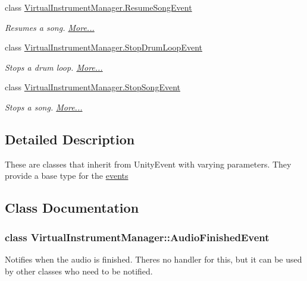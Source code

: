 \begin{DoxyCompactItemize}
class \hyperlink{group___v_i_m_event_types_class_virtual_instrument_manager_1_1_resume_song_event}{Virtual\+Instrument\+Manager.\+Resume\+Song\+Event}
\begin{DoxyCompactList}\small\item\em Resumes a song.  \hyperlink{group___v_i_m_event_types_class_virtual_instrument_manager_1_1_resume_song_event}{More...}\end{DoxyCompactList}\item 
class \hyperlink{group___v_i_m_event_types_class_virtual_instrument_manager_1_1_stop_drum_loop_event}{Virtual\+Instrument\+Manager.\+Stop\+Drum\+Loop\+Event}
\begin{DoxyCompactList}\small\item\em Stops a drum loop.  \hyperlink{group___v_i_m_event_types_class_virtual_instrument_manager_1_1_stop_drum_loop_event}{More...}\end{DoxyCompactList}\item 
class \hyperlink{group___v_i_m_event_types_class_virtual_instrument_manager_1_1_stop_song_event}{Virtual\+Instrument\+Manager.\+Stop\+Song\+Event}
\begin{DoxyCompactList}\small\item\em Stops a song.  \hyperlink{group___v_i_m_event_types_class_virtual_instrument_manager_1_1_stop_song_event}{More...}\end{DoxyCompactList}\end{DoxyCompactItemize}


\subsection{Detailed Description}
These are classes that inherit from Unity\+Event with varying parameters. They provide a base type for the \hyperlink{group___v_i_m_events}{events } 

\subsection{Class Documentation}
\label{class_virtual_instrument_manager_1_1_audio_finished_event}
\subsubsection{class Virtual\+Instrument\+Manager\+:\+:Audio\+Finished\+Event}
Notifies when the audio is finished. There\textquotesingle{}s no handler for this, but it can be used by other classes who need to be notified. 


